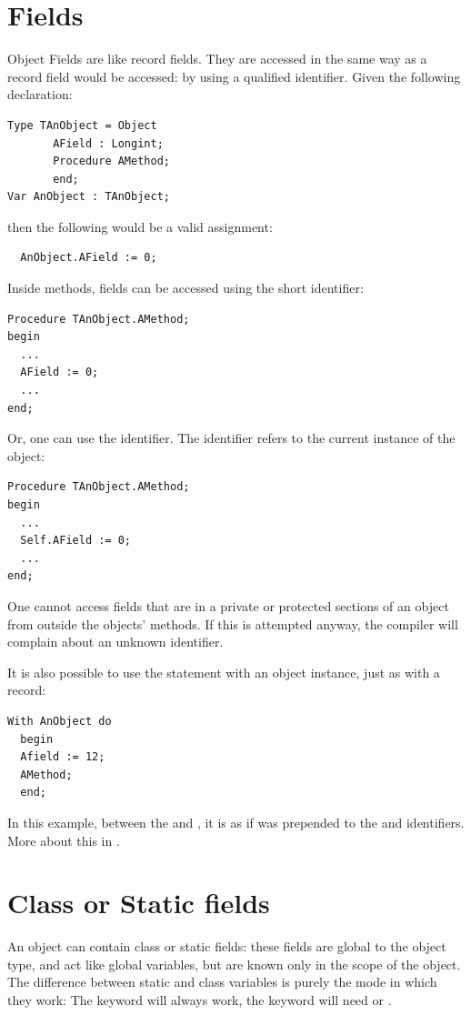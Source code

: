 \section{Fields}
Object Fields are like record fields. They are accessed in the same way as
a record field would be accessed: by using a qualified identifier. Given the
following declaration:
\begin{verbatim}
Type TAnObject = Object
       AField : Longint;
       Procedure AMethod;
       end;
Var AnObject : TAnObject;
\end{verbatim}
then the following would be a valid assignment:
\begin{verbatim}
  AnObject.AField := 0;
\end{verbatim}
Inside methods, fields can be accessed using the short identifier:
\begin{verbatim}
Procedure TAnObject.AMethod;
begin
  ...
  AField := 0;
  ...
end;
\end{verbatim}
Or, one can use the  identifier. The  identifier refers
to the current instance of the object:
\begin{verbatim}
Procedure TAnObject.AMethod;
begin
  ...
  Self.AField := 0;
  ...
end;
\end{verbatim}
One cannot access fields that are in a private or protected sections of an object from
outside the objects' methods. If this is attempted anyway, the compiler will complain about
an unknown identifier.

It is also possible to use the  statement with an object instance,
just as with a record:
\begin{verbatim}
With AnObject do
  begin
  Afield := 12;
  AMethod;
  end;
\end{verbatim}
In this example, between the  and , it is as if
 was prepended to the  and 
identifiers. More about this in .

\section{Class or Static fields}
An object can contain class or static fields: these fields are global to the object type,
and act like global variables, but are known only in the scope of the object.
The difference between static and class variables is purely the mode in which they work:
The  keyword will always work, the  keyword will need   or .

